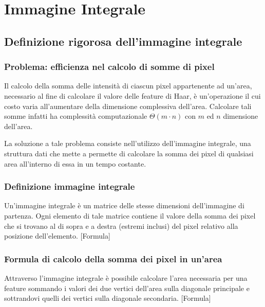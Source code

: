     \section{Immagine Integrale}
    \label{sec:integral_image}
        \subsection{Definizione rigorosa dell'immagine integrale}
            \subsubsection{Problema: efficienza nel calcolo di somme di pixel}
                Il calcolo della somma delle intensità di ciascun pixel appartenente ad un'area, necessario al fine di calcolare il valore delle feature di Haar, è un'operazione il cui costo varia all'aumentare della dimensione complessiva dell'area.
                Calcolare tali somme infatti ha complessità computazionale $\Theta(m \cdot n)$ con $m$ ed $n$ dimensione dell'area.

                La soluzione a tale problema consiste nell'utilizzo dell'immagine integrale, una struttura dati che mette a permette di calcolare la somma dei pixel di qualsiasi area all'interno di essa in un tempo costante.
            \subsubsection{Definizione immagine integrale}
                Un'immagine integrale è un matrice delle stesse dimensioni dell'immagine di partenza.
                Ogni elemento di tale matrice contiene il valore della somma dei pixel che si trovano al di sopra e a destra (estremi inclusi) del pixel relativo alla posizione dell'elemento.
                [Formula]
            \subsubsection{Formula di calcolo della somma dei pixel in un'area}
                Attraverso l'immagine integrale è possibile calcolare l'area necessaria per una feature sommando i valori dei due vertici dell'area sulla diagonale principale e sottrandovi quelli dei vertici sulla diagonale secondaria.
                [Formula]

